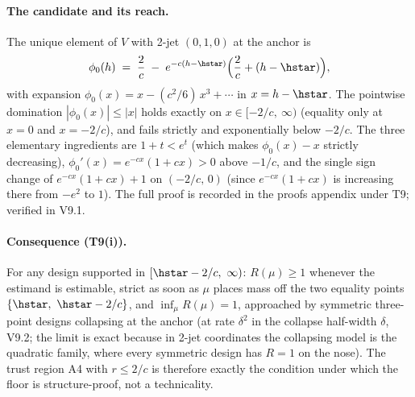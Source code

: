 \paragraph{The candidate and its reach.}
The unique element of $V$ with 2-jet $(0,1,0)$ at the anchor is
\begin{equation*}
\phi_0(h) \;=\; \frac{2}{c}
\;-\; e^{-c(h-\hstar)}\Big(\frac{2}{c} + (h-\hstar)\Big),
\end{equation*}
with expansion $\phi_0(x) = x - (c^2/6)\,x^3 + \cdots$ in $x=h-\hstar$.
The pointwise domination $|\phi_0(x)|\le |x|$ holds exactly on
$x\in[-2/c,\ \infty)$ (equality only at $x=0$ and $x=-2/c$), and fails
strictly and exponentially below $-2/c$. The three elementary ingredients
are $1+t < e^t$ (which makes $\phi_0(x)-x$ strictly decreasing),
$\phi_0'(x) = e^{-cx}(1+cx) > 0$ above $-1/c$, and the single sign change
of $e^{-cx}(1+cx)+1$ on $(-2/c,\,0)$ (since $e^{-cx}(1+cx)$ is increasing
there from $-e^2$ to $1$). The full proof is recorded in the proofs
appendix under T9; verified in V9.1.

\paragraph{Consequence (T9(i)).}
For any design supported in $[\hstar-2/c,\ \infty)$: $R(\mu)\ge 1$
whenever the estimand is estimable, strict as soon as $\mu$ places mass
off the two equality points $\{\hstar,\ \hstar-2/c\}$, and
$\inf_\mu R(\mu)=1$, approached by symmetric
three-point designs collapsing at the anchor (at rate $\delta^2$ in the
collapse half-width $\delta$, V9.2; the limit is exact because in 2-jet
coordinates the collapsing model is the quadratic family, where every
symmetric design has $R=1$ on the nose). The trust region A4 with
$r\le 2/c$ is therefore exactly the condition under which the floor is
structure-proof, not a technicality.


